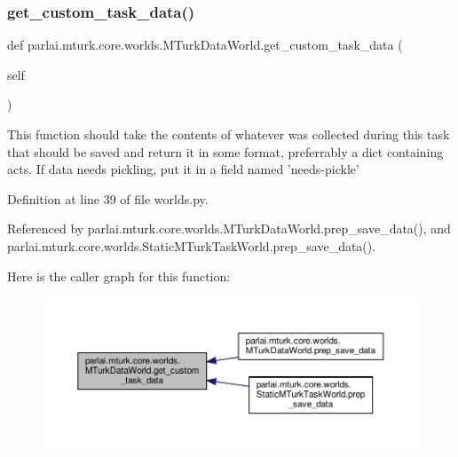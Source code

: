 \subsubsection{\texorpdfstring{get\+\_\+custom\+\_\+task\+\_\+data()}{get\_custom\_task\_data()}}
{\footnotesize\ttfamily def parlai.\+mturk.\+core.\+worlds.\+M\+Turk\+Data\+World.\+get\+\_\+custom\+\_\+task\+\_\+data (\begin{DoxyParamCaption}\item[{}]{self }\end{DoxyParamCaption})}

\begin{DoxyVerb}This function should take the contents of whatever was collected
during this task that should be saved and return it in some format,
preferrably a dict containing acts. If data needs pickling, put it
in a field named 'needs-pickle'\end{DoxyVerb}
 

Definition at line 39 of file worlds.\+py.



Referenced by parlai.\+mturk.\+core.\+worlds.\+M\+Turk\+Data\+World.\+prep\+\_\+save\+\_\+data(), and parlai.\+mturk.\+core.\+worlds.\+Static\+M\+Turk\+Task\+World.\+prep\+\_\+save\+\_\+data().

Here is the caller graph for this function\+:
\nopagebreak
\begin{figure}[H]
\begin{center}
\leavevmode
\includegraphics[width=350pt]{classparlai_1_1mturk_1_1core_1_1worlds_1_1MTurkDataWorld_a9aefd4525fc9b34aa6f7309e78a8e231_icgraph}
\end{center}
\end{figure}
\mbox{\label{classparlai_1_1mturk_1_1core_1_1worlds_1_1MTurkDataWorld_a13f5b85f9694627df2e181267588d4dc}} 
